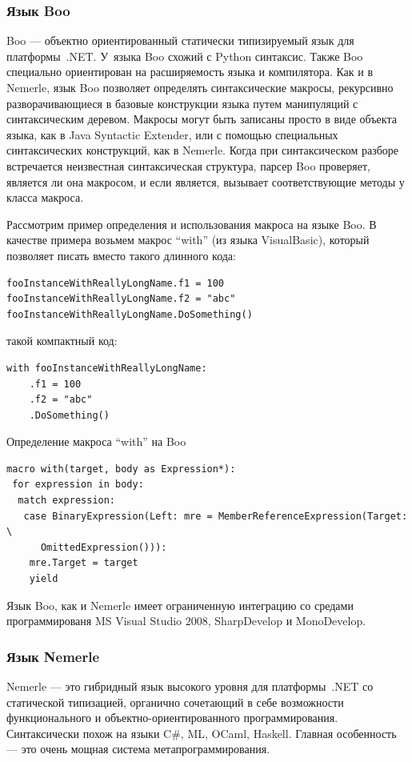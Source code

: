 \documentclass[a4paper,12pt,titlepage]{extarticle}
\begin{document}
\subsubsection*{Язык Boo}
Boo --- объектно ориентированный статически типизируемый язык для платформы~.NET.
У~языка Boo схожий с Python синтаксис. Также Boo специально ориентирован на
расширяемость языка и компилятора. Как и в Nemerle, язык Boo позволяет
определять синтаксические макросы, рекурсивно разворачивающиеся в базовые
конструкции языка путем манипуляций с синтаксическим деревом. Макросы могут
быть записаны просто в виде объекта языка, как в Java Syntactic Extender, или с
помощью специальных синтаксических конструкций, как в Nemerle. Когда при
синтаксическом разборе встречается неизвестная синтаксическая структура, парсер
Boo проверяет, является ли она макросом, и если является, вызывает
соответствующие методы у класса макроса.

Рассмотрим пример определения и использования макроса на языке Boo. В качестве
примера возьмем макрос ``with'' (из языка VisualBasic), который позволяет писать
вместо такого длинного кода:
\begin{verbatim}
fooInstanceWithReallyLongName.f1 = 100
fooInstanceWithReallyLongName.f2 = "abc"
fooInstanceWithReallyLongName.DoSomething()
\end{verbatim}
такой компактный код:
\begin{verbatim}
with fooInstanceWithReallyLongName:
    .f1 = 100
    .f2 = "abc"
    .DoSomething()
\end{verbatim}
Определение макроса ``with'' на Boo
\begin{verbatim}
macro with(target, body as Expression*):
 for expression in body:
  match expression:
   case BinaryExpression(Left: mre = MemberReferenceExpression(Target: \ 
      OmittedExpression())):
    mre.Target = target
    yield
\end{verbatim}

Язык Boo, как и Nemerle имеет ограниченную интеграцию со средами программированя
MS Visual Studio 2008, SharpDevelop и MonoDevelop.

\subsubsection*{Язык Nemerle}
Nemerle — это гибридный язык высокого уровня для платформы~.NET со статической
типизацией, органично сочетающий в себе возможности функционального и
объектно-ориентированного программирования. Синтаксически похож на языки C\#,
ML, OCaml, Haskell. Главная особенность --- это очень мощная система
метапрограммирования.
\end{document}
